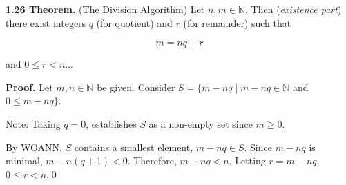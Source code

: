 \documentclass[12pt]{article}
\begin{document}
\noindent\textbf{1.26 Theorem.} (The Division Algorithm) Let $n,m\in\mathbb{N}$. Then (\textit{existence part}) there exist integers $q$ (for quotient) and $r$ (for remainder) such that 

\begin{equation*}
m=nq+r
\end{equation*}

\noindent and $0\leq r < n$...

\bigskip

\noindent\textbf{Proof.} Let $m,n\in\mathbb{N}$ be given. Consider $S=\{m-nq\mid m-nq\in\mathbb{N}$ and $0\leq m-nq\}$.

\bigskip

\noindent Note: Taking $q=0$, establishes $S$ as a non-empty set since $m\geq 0$.

\bigskip

\noindent By WOANN, $S$ contains a smallest element, $m-nq\in S$. Since $m-nq$ is minimal, $m-n(q+1) < 0$. Therefore, $m-nq < n$. Letting $r=m-nq$, $0\leq r < n$.\qed
\end{document}
